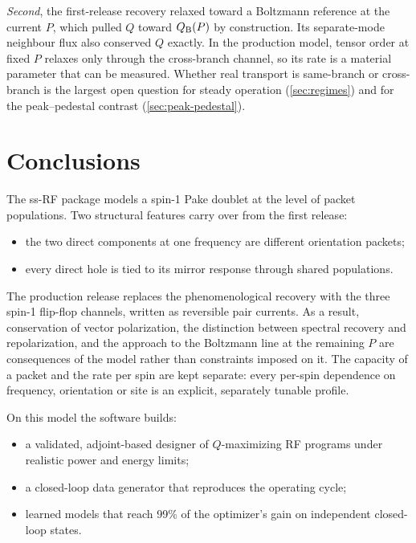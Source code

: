 \documentclass[11pt]{article}
\begin{document}
\emph{Second}, the first-release recovery relaxed toward a Boltzmann reference at the current
\(P\), which pulled \(Q\) toward \(Q_{\rm B}(P)\) by construction. Its separate-mode neighbour
flux also conserved \(Q\) exactly. In the production model, tensor order at fixed \(P\) relaxes
only through the cross-branch channel, so its rate is a material parameter that can be measured.
Whether real transport is same-branch or cross-branch is the largest open question for steady
operation (\cref{sec:regimes}) and for the peak--pedestal contrast (\cref{sec:peak-pedestal}).

\section{Conclusions}

The ss-RF package models a spin-1 Pake doublet at the level of packet populations. Two
structural features carry over from the first release:
\begin{itemize}
\item the two direct components at one frequency are different orientation packets;
\item every direct hole is tied to its mirror response through shared populations.
\end{itemize}

The production release replaces the phenomenological recovery with the three spin-1 flip-flop
channels, written as reversible pair currents. As a result, conservation of vector polarization,
the distinction between spectral recovery and repolarization, and the approach to the Boltzmann
line at the remaining \(P\) are consequences of the model rather than constraints imposed on it.
The capacity of a packet and the rate per spin are kept separate: every per-spin dependence on
frequency, orientation or site is an explicit, separately tunable profile.

On this model the software builds:
\begin{itemize}
\item a validated, adjoint-based designer of \(Q\)-maximizing RF programs under realistic power
and energy limits;
\item a closed-loop data generator that reproduces the operating cycle;
\item learned models that reach 99\% of the optimizer's gain on independent closed-loop states.
\end{itemize}
\end{document}
